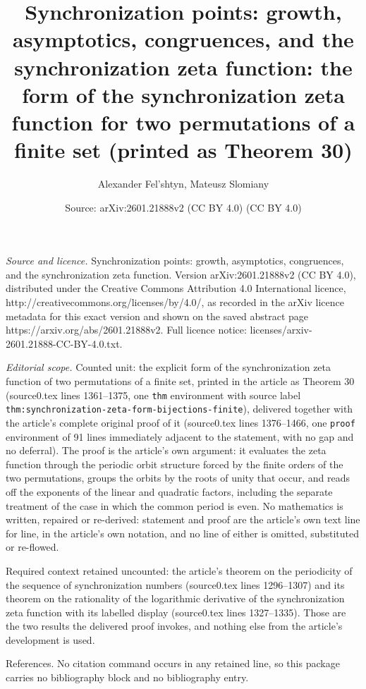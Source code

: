 \documentclass[10pt,a4paper]{amsart}
\title[Synchronization points: growth, asymptotics, congruences, and the synchronization zeta function]{Synchronization points: growth, asymptotics, congruences, and the synchronization zeta function: the form of the synchronization zeta function for two permutations of a finite set (printed as Theorem 30)}
\author{Alexander Fel'shtyn, Mateusz Slomiany}
\date{Source: arXiv:2601.21888v2 (CC BY 4.0) (CC BY 4.0)}
\theoremstyle{plain}
\theoremstyle{definition}
\theoremstyle{remark}
\begin{document}
\maketitle

\noindent\emph{Source and licence.} Synchronization points: growth, asymptotics, congruences, and the synchronization zeta function. Version arXiv:2601.21888v2 (CC BY 4.0), distributed under the Creative Commons Attribution 4.0 International licence, http://creativecommons.org/licenses/by/4.0/, as recorded in the arXiv licence metadata for this exact version and shown on the saved abstract page https://arxiv.org/abs/2601.21888v2. Full licence notice: licenses/arxiv-2601.21888-CC-BY-4.0.txt.\par\smallskip

\noindent\textit{Editorial scope.} Counted unit: the explicit form of the synchronization zeta function of two permutations of a finite set, printed in the article as Theorem 30 (source0.tex lines 1361--1375, one \texttt{thm} environment with source label \texttt{thm:synchronization-zeta-form-bijections-finite}), delivered together with the article's complete original proof of it (source0.tex lines 1376--1466, one \texttt{proof} environment of 91 lines immediately adjacent to the statement, with no gap and no deferral). The proof is the article's own argument: it evaluates the zeta function through the periodic orbit structure forced by the finite orders of the two permutations, groups the orbits by the roots of unity that occur, and reads off the exponents of the linear and quadratic factors, including the separate treatment of the case in which the common period is even. No mathematics is written, repaired or re-derived: statement and proof are the article's own text line for line, in the article's own notation, and no line of either is omitted, substituted or re-flowed.

Required context retained uncounted: the article's theorem on the periodicity of the sequence of synchronization numbers (source0.tex lines 1296--1307) and its theorem on the rationality of the logarithmic derivative of the synchronization zeta function with its labelled display (source0.tex lines 1327--1335). Those are the two results the delivered proof invokes, and nothing else from the article's development is used.

References. No citation command occurs in any retained line, so this package carries no bibliography block and no bibliography entry.
\end{document}
